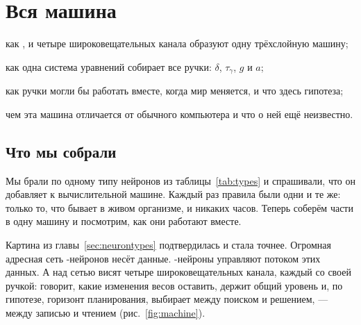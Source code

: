 \chapter{Вся машина}
\label{sec:synthesis}
\begin{chaptergoals}
\item как ,  и четыре широковещательных канала образуют одну трёхслойную машину;
\item как одна система уравнений собирает все ручки: $\delta$, $\tau_\gamma$, $g$ и $a$;
\item как ручки могли бы работать вместе, когда мир меняется, и что здесь гипотеза;
\item чем эта машина отличается от обычного компьютера и что о ней ещё неизвестно.
\end{chaptergoals}

\section{Что мы собрали}

Мы брали по одному типу нейронов из таблицы~\ref{tab:types} и спрашивали, что он добавляет к вычислительной машине. Каждый раз правила были одни и те же: только то, что бывает в живом организме, и никаких часов. Теперь соберём части в одну машину и посмотрим, как они работают вместе.

Картина из главы~\ref{sec:neurontypes} подтвердилась и стала точнее. Огромная адресная сеть -нейронов несёт данные. -нейроны управляют потоком этих данных. А над сетью висят четыре широковещательных канала, каждый со своей ручкой:  говорит, какие изменения весов оставить,  держит общий уровень и, по гипотезе, горизонт планирования,  выбирает между поиском и решением,  --- между записью и чтением (рис.~\ref{fig:machine}).

